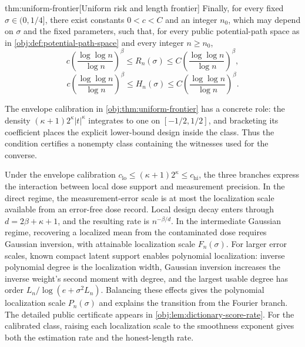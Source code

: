 \begin{theoremv}{thm:uniform-frontier}[Uniform risk and length frontier]
Finally, for every fixed \(\sigma\in(0,1/4]\), there exist constants \(0<c<C\) and an integer \(n_0\), which may depend on \(\sigma\) and the fixed parameters, such that, for every public potential-path space as in \cref{obj:def:potential-path-space} and every integer \(n\ge n_0\),
\[
c\left(\frac{\log\log n}{\log n}\right)^\beta
\le R_n(\sigma)\le
C\left(\frac{\log\log n}{\log n}\right)^\beta,
\]
\[
c\left(\frac{\log\log n}{\log n}\right)^\beta
\le H_n(\sigma)\le
C\left(\frac{\log\log n}{\log n}\right)^\beta.
\]
\end{theoremv}

The envelope calibration in \cref{obj:thm:uniform-frontier} has a concrete role: the density \((\kappa+1)2^\kappa|t|^\kappa\) integrates to one on \([-1/2,1/2]\), and bracketing its coefficient places the explicit lower-bound design inside the class. Thus the condition certifies a nonempty class containing the witnesses used for the converse.

Under the envelope calibration \(c_{\mathrm{lo}}\le(\kappa+1)2^\kappa\le c_{\mathrm{hi}}\), the three branches express the interaction between local dose support and measurement precision. In the direct regime, the measurement-error scale is at most the localization scale available from an error-free dose record. Local design decay enters through \(d=2\beta+\kappa+1\), and the resulting rate is \(n^{-\beta/d}\). In the intermediate Gaussian regime, recovering a localized mean from the contaminated dose requires Gaussian inversion, with attainable localization scale \(F_n(\sigma)\). For larger error scales, known compact latent support enables polynomial localization: inverse polynomial degree is the localization width, Gaussian inversion increases the inverse weight's second moment with degree, and the largest usable degree has order \(L_n/\log(e+\sigma^2L_n)\). Balancing these effects gives the polynomial localization scale \(P_n(\sigma)\) and explains the transition from the Fourier branch. The detailed public certificate appears in \cref{obj:lem:dictionary-score-rate}. For the calibrated class, raising each localization scale to the smoothness exponent gives both the estimation rate and the honest-length rate.

